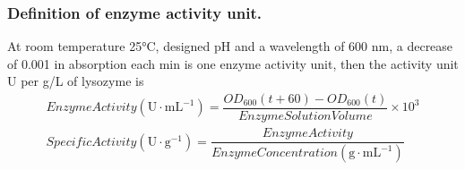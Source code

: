 
\subsubsection{Definition of enzyme activity unit.}

At room temperature 25°C, designed pH and a wavelength of 600 nm, a decrease of 0.001 in absorption each min is one enzyme
activity unit, then the activity unit U per g/L of lysozyme is
\begin{gather*}
	EnzymeActivity(\mathrm{U\cdot mL^{-1}})=\dfrac{OD_{600}(t+60)-OD_{600}(t)}{Enzyme Solution Volume}\times 10^{3}\\
	SpecificActivity(\mathrm{U\cdot g^{-1} })=\dfrac{EnzymeActivity}{Enzyme Concentration(\mathrm{g\cdot mL^{-1}})}
\end{gather*}
